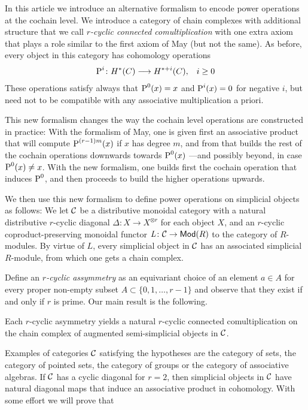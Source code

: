 In this article we introduce an alternative formalism to encode power operations at the cochain level. We introduce a category of chain complexes with additional structure that we call \emph{$r$-cyclic connected comultiplication} with one extra axiom that plays a role similar to the first axiom of May (but not the same). As before, every object in this category has cohomology operations
\begin{align*}
	\operatorname{P}^i\colon H^*(C)&\longrightarrow H^{*+i}(C), &i\geq 0
\end{align*}
These operations satisfy always that $\operatorname{P}^0(x) = x$ and $\operatorname{P}^{i}(x) = 0$ for negative $i$, but need not to be compatible with any associative multiplication a priori. %

This new formalism changes the way the cochain level operations are constructed in practice: With the formalism of May, one is given first an associative product that will compute $\operatorname{P}^{(r-1)m}(x)$ if $x$ has degree $m$, and from that builds the rest of the cochain operations downwards towards $\operatorname{P}^0(x)$ ---and possibly beyond, in case $\operatorname{P}^0(x)\neq x$. With the new formalism, one builds first the cochain operation that induces $\operatorname{P}^0$, and then proceeds to build the higher operations upwards.

We then use this new formalism to define power operations on simplicial objects as follows: We let $\mathcal{C}$ be a distributive monoidal category with a natural distributive $r$-cyclic diagonal $\Delta\colon X\to X^{\otimes r}$ for each object $X$, and an $r$-cyclic coproduct-preserving monoidal functor $\operatorname{{\it L}}\colon \mathcal{C}\to \mathsf{Mod}(R)$ to the category of $R$-modules. By virtue of $L$, every simplicial object in $\mathcal{C}$ has an associated simplicial $R$-module, from which one gets a chain complex.

Define an \emph{$r$-cyclic assymmetry} as an equivariant choice of an element $a\in A$ for every proper non-empty subset $A\subset \{0,1,\ldots,r-1\}$ and observe that they exist if and only if $r$ is prime. Our main result is the following.

\begin{theorem}\label{thm:main}
	Each $r$-cyclic asymmetry yields a natural $r$-cyclic connected comultiplication on the chain complex of augmented semi-simplicial objects in $\mathcal{C}$.
\end{theorem}

Examples of categories $\mathcal{C}$ satisfying the hypotheses are the category of sets, the category of pointed sets, the category of groups or the category of associative algebras. If $\mathcal{C}$ has a cyclic diagonal for $r= 2$, then simplicial objects in $\mathcal{C}$ have natural diagonal maps that induce an associative product in cohomology. With some effort we will prove that

